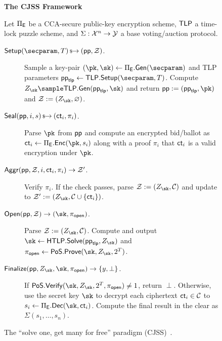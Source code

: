 \begin{figure}[ht]
\begin{mdframed}
\begin{center}
    \textbf{The CJSS Framework}
\end{center}
Let $\Pi_{\sf E}$ be a CCA-secure public-key encryption scheme, $\mathsf{TLP}$ a time-lock puzzle scheme, and $\Sigma: \mathcal{X}^n \rightarrow \mathcal{Y}$ a base voting/auction protocol.
\begin{description}
    \item[$\Setup(\secparam, \timeT) \randout (\pparam, \Z)$.] Sample a key-pair $(\pk, \sk) \gets \Pi_{\sf E}.{\sf Gen}(\secparam)$ and TLP parameters $\pparam_{\sf tlp} \gets \tlp.\Setup(\secparam, \timeT)$. Compute $Z_{\sk} \sample \tlp.\mathsf{Gen}(\pparam_{\sf tlp},\sk)$ and return $\pparam := (\pparam_{\sf tlp}, \pk)$ and $\Z := (Z_{\sk}, \emptyset)$.
    \item[$\mathsf{Seal}(\mathsf{pp}, i, s) \,{\mbox{\scriptsize${\$}$\normalsize}\!\!\to}\hskip2.3pt (\mathsf{ct}_i, \pi_{i})$.] Parse $\pk$ from $\mathsf{pp}$ and compute an encrypted bid/ballot as $\ct_i \gets \Pi_{\sf E}.\enc(\pk,s_i)$ along with a proof $\pi_{i}$ that $\mathsf{ct}_i$ is a valid encryption under $\pk$.
    \item[$\mathsf{Aggr}(\mathsf{pp}, \mathcal{Z}, i, \mathsf{ct}_{i}, \pi_{i}) \rightarrow \mathcal{Z}'$.] Verify $\pi_{i}$. If the check passes, parse $\Z := (Z_{\sk}, \mathcal{C})$ and update to $\Z' := (Z_{\sk}, \mathcal{C} \cup \{ \ct_{i} \})$.
    \item[$\Open(\pparam,\Z) \rightarrow (\sk, \pi_{\sf open})$.] Parse $\Z := (Z_{\sk}, \mathcal{C})$. Compute and output $\sk \leftarrow \htlp.\mathsf{Solve}(\pparam_{\sf tlp},\allowbreak Z_{\sk})$ and $\pi_{\sf open} \gets \pos.\prove(\sk, Z_{\sk}, 2^\timeT)$.
    \item[$\Finalize(\pparam,Z_{\sk}, \sk, \pi_{\sf open}) \rightarrow \{y, \perp\}$.] If $\pos.\vrfy(\sk, Z_{\sk}, 2^\timeT, \pi_{\sf open}) \neq 1$, return $\perp$. Otherwise, use the secret key $\sk$ to decrypt each ciphertext $\mathsf{ct}_i \in \mathcal{C}$ to $s_i \gets \Pi_{\sf E}.\dec(\sk, \ct_i)$. Compute the final result in the clear as $\Sigma(s_1, \dots, s_n)$.
\end{description}
\end{mdframed}
\caption{The ``solve one, get many for free'' paradigm (CJSS)~\cite{ESORICS:CJSS21}.}
\label{fig:solve_one_protocol}
\end{figure}
